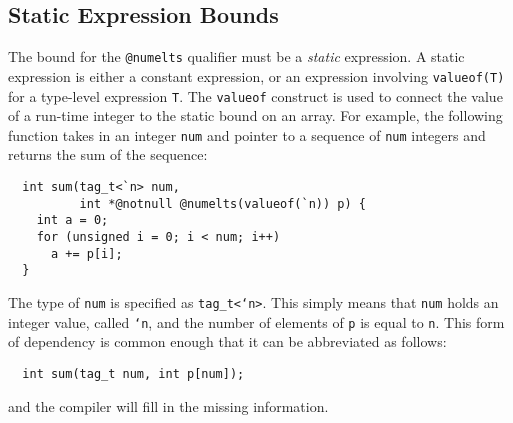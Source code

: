 \subsection{Static Expression Bounds}

The bound for the \texttt{@numelts} qualifier 
must be a \emph{static} expression.  A static
expression is either a constant expression, or an expression involving
\texttt{valueof(T)} for a type-level expression \texttt{T}.  The
\texttt{valueof} construct is used to connect the value of a run-time
integer to the static bound on an array.  For example, the following
function takes in an integer \texttt{num} and pointer to a sequence
of \texttt{num} integers and returns the sum of the sequence:
\begin{verbatim}
  int sum(tag_t<`n> num, 
          int *@notnull @numelts(valueof(`n)) p) {
    int a = 0;
    for (unsigned i = 0; i < num; i++) 
      a += p[i];
  }
\end{verbatim}
The type of \texttt{num} is specified as \texttt{tag_t<`n>}.  This
simply means that \texttt{num} holds an integer value, called \texttt{`n},
and the number of elements of \texttt{p} is equal to \texttt{n}.  
This form of dependency is common enough that it can be abbreviated
as follows:
\begin{verbatim}
  int sum(tag_t num, int p[num]);
\end{verbatim}
and the compiler will fill in the missing information.  





